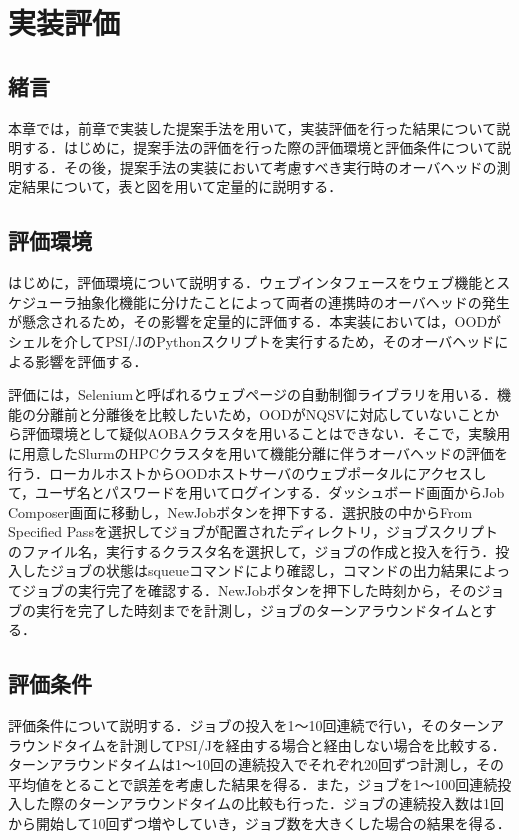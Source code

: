 \section{実装評価}
\subsection{緒言}
本章では，前章で実装した提案手法を用いて，実装評価を行った結果について説明する．はじめに，提案手法の評価を行った際の評価環境と評価条件について説明する．その後，提案手法の実装において考慮すべき実行時のオーバヘッドの測定結果について，表と図を用いて定量的に説明する．\par

\subsection{評価環境}
はじめに，評価環境について説明する．ウェブインタフェースをウェブ機能とスケジューラ抽象化機能に分けたことによって両者の連携時のオーバヘッドの発生が懸念されるため，その影響を定量的に評価する．本実装においては，OODがシェルを介してPSI/JのPythonスクリプトを実行するため，そのオーバヘッドによる影響を評価する．\par
評価には，Selenium\cite{cite6}と呼ばれるウェブページの自動制御ライブラリを用いる．機能の分離前と分離後を比較したいため，OODがNQSVに対応していないことから評価環境として疑似AOBAクラスタを用いることはできない．そこで，実験用に用意したSlurmのHPCクラスタを用いて機能分離に伴うオーバヘッドの評価を行う．ローカルホストからOODホストサーバのウェブポータルにアクセスして，ユーザ名とパスワードを用いてログインする．ダッシュボード画面からJob Composer画面に移動し，NewJobボタンを押下する．選択肢の中からFrom Specified Passを選択してジョブが配置されたディレクトリ，ジョブスクリプトのファイル名，実行するクラスタ名を選択して，ジョブの作成と投入を行う．投入したジョブの状態はsqueueコマンドにより確認し，コマンドの出力結果によってジョブの実行完了を確認する．NewJobボタンを押下した時刻から，そのジョブの実行を完了した時刻までを計測し，ジョブのターンアラウンドタイムとする．\par

\subsection{評価条件}
評価条件について説明する．ジョブの投入を1～10回連続で行い，そのターンアラウンドタイムを計測してPSI/Jを経由する場合と経由しない場合を比較する．ターンアラウンドタイムは1～10回の連続投入でそれぞれ20回ずつ計測し，その平均値をとることで誤差を考慮した結果を得る．また，ジョブを1～100回連続投入した際のターンアラウンドタイムの比較も行った．ジョブの連続投入数は1回から開始して10回ずつ増やしていき，ジョブ数を大きくした場合の結果を得る．\par


